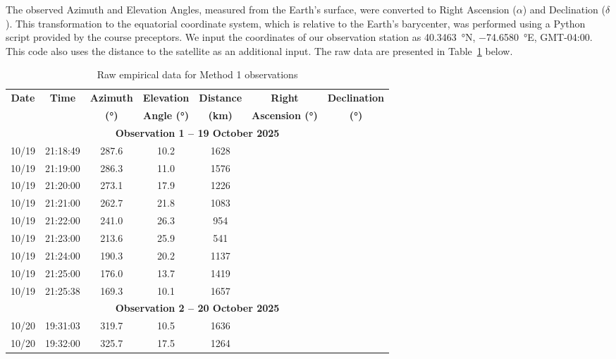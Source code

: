 \documentclass{article}
\begin{document}
The observed Azimuth and Elevation Angles, measured from the Earth's surface, were converted to Right Ascension ($\alpha$) and Declination ($\delta$). This transformation to the equatorial coordinate system, which is relative to the Earth's barycenter, was performed using a Python script provided by the course preceptors. We input the coordinates of our observation station as \SI{40.3463}{\degree}N, \SI{-74.6580}{\degree}E, GMT-04:00. This code also uses the distance to the satellite as an additional input. The raw data are presented in Table~\ref{tab:method1_data} below.

\begin{table}[H]
    \centering
    \caption{Raw empirical data for Method 1 observations}
    \label{tab:method1_data}
    \renewcommand{\arraystretch}{1.2}
    \begin{tabular}{|c|c|c|c|c|c|c|}
        \hline
        \textbf{Date} & \textbf{Time} & \textbf{Azimuth} & \textbf{Elevation} & \textbf{Distance} & \textbf{Right} & \textbf{Declination} \\ 
        \textbf{ } & \textbf{ } & \textbf{(°)} & \textbf{Angle (°)} & \textbf{(km)} & \textbf{Ascension (°)} & \textbf{(°)} \\ \hline
        \multicolumn{7}{|c|}{\textbf{Observation 1 – 19 October 2025}} \\ \hline
        10/19 & 21:18:49 & 287.6 & 10.2 & 1628 &  &  \\ \hline
        10/19 & 21:19:00 & 286.3 & 11.0 & 1576 &  &  \\ \hline
        10/19 & 21:20:00 & 273.1 & 17.9 & 1226 &  &  \\ \hline
        10/19 & 21:21:00 & 262.7 & 21.8 & 1083 &  &  \\ \hline
        10/19 & 21:22:00 & 241.0 & 26.3 &  954 &  &  \\ \hline
        10/19 & 21:23:00 & 213.6 & 25.9 &  541 &  &  \\ \hline
        10/19 & 21:24:00 & 190.3 & 20.2 & 1137 &  &  \\ \hline
        10/19 & 21:25:00 & 176.0 & 13.7 & 1419 &  &  \\ \hline
        10/19 & 21:25:38 & 169.3 & 10.1 & 1657 &  &  \\ \hline
        \multicolumn{7}{|c|}{\textbf{Observation 2 – 20 October 2025}} \\ \hline
        10/20 & 19:31:03 & 319.7 & 10.5 & 1636 &  &  \\ \hline
        10/20 & 19:32:00 & 325.7 & 17.5 & 1264 &  &  \\ \hline

\end{tabular}
\end{table}
\end{document}
